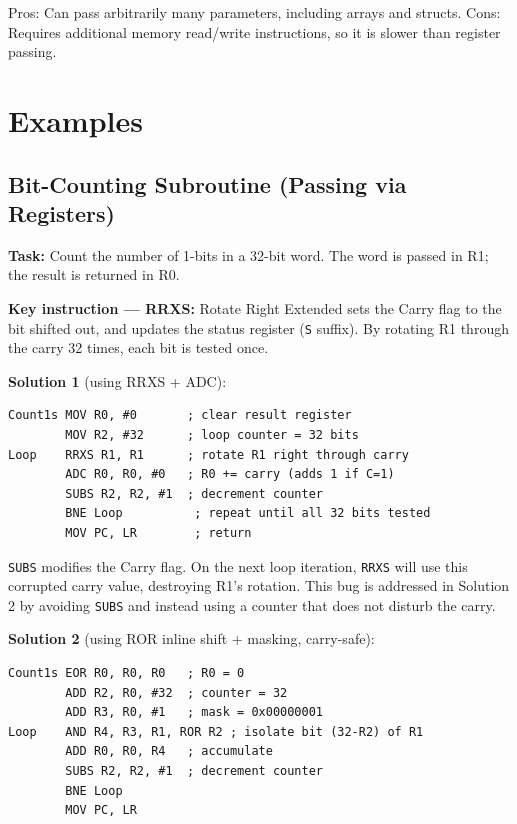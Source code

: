 \documentclass[11pt, a4paper, notitlepage]{report}
\theoremstyle{definition}
\theoremstyle{remark}
\theoremstyle{definition}
\begin{document}
Pros: Can pass arbitrarily many parameters, including arrays and structs. Cons: Requires additional memory read/write instructions, so it is slower than register passing.

\section{Examples}

\subsection{Bit-Counting Subroutine (Passing via Registers)}

\textbf{Task:} Count the number of 1-bits in a 32-bit word. The word is passed in R1; the result is returned in R0.

\textbf{Key instruction --- RRXS:} Rotate Right Extended sets the Carry flag to the bit shifted out, and updates the status register (\texttt{S} suffix). By rotating R1 through the carry 32 times, each bit is tested once.

\textbf{Solution 1} (using RRXS + ADC):

\begin{lstlisting}
Count1s MOV R0, #0       ; clear result register
        MOV R2, #32      ; loop counter = 32 bits
Loop    RRXS R1, R1      ; rotate R1 right through carry
        ADC R0, R0, #0   ; R0 += carry (adds 1 if C=1)
        SUBS R2, R2, #1  ; decrement counter
        BNE Loop          ; repeat until all 32 bits tested
        MOV PC, LR        ; return
\end{lstlisting}

\begin{warning}[title={Carry Flag Corruption}]
\texttt{SUBS} modifies the Carry flag. On the next loop iteration, \texttt{RRXS} will use this corrupted carry value, destroying R1's rotation. This bug is addressed in Solution 2 by avoiding \texttt{SUBS} and instead using a counter that does not disturb the carry.
\end{warning}

\textbf{Solution 2} (using ROR inline shift + masking, carry-safe):

\begin{lstlisting}
Count1s EOR R0, R0, R0   ; R0 = 0
        ADD R2, R0, #32  ; counter = 32
        ADD R3, R0, #1   ; mask = 0x00000001
Loop    AND R4, R3, R1, ROR R2 ; isolate bit (32-R2) of R1
        ADD R0, R0, R4   ; accumulate
        SUBS R2, R2, #1  ; decrement counter
        BNE Loop
        MOV PC, LR
\end{lstlisting}
\end{document}
